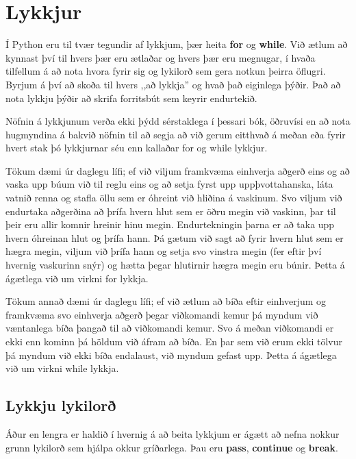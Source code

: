 
\chapter{Lykkjur}\label{k:lykkjur}

Í Python eru til tvær tegundir af lykkjum, þær heita \textbf{for} og \textbf{while}.
Við ætlum að kynnast því til hvers þær eru ætlaðar og hvers þær eru megnugar, í hvaða tilfellum á að nota hvora fyrir sig og lykilorð sem gera notkun þeirra öflugri.
Byrjum á því að skoða til hvers ,,að lykkja'' og hvað það eiginlega þýðir.
Það að nota lykkju þýðir að skrifa forritsbút sem keyrir endurtekið.

Nöfnin á lykkjunum verða ekki þýdd sérstaklega í þessari bók, öðruvísi en að nota hugmyndina á bakvið nöfnin til að segja að við gerum eitthvað á meðan eða fyrir hvert stak þó lykkjurnar séu enn kallaðar for og while lykkjur.

Tökum dæmi úr daglegu lífi; ef við viljum framkvæma einhverja aðgerð eins og að vaska upp búum við til reglu eins og að setja fyrst upp uppþvottahanska, láta vatnið renna og stafla öllu sem er óhreint við hliðina á vaskinum. 
Svo viljum við endurtaka aðgerðina að þrífa hvern hlut sem er öðru megin við vaskinn, þar til þeir eru allir komnir hreinir hinu megin.
Endurtekningin þarna er að taka upp hvern óhreinan hlut og þrífa hann.
Þá gætum við sagt að fyrir hvern hlut sem er hægra megin, viljum við þrífa hann og setja svo vinstra megin (fer eftir því hvernig vaskurinn snýr) og hætta þegar hlutirnir hægra megin eru búnir.
Þetta á ágætlega við um virkni for lykkja.

Tökum annað dæmi úr daglegu lífi; ef við ætlum að bíða eftir einhverjum og framkvæma svo einhverja aðgerð þegar viðkomandi kemur þá myndum við væntanlega bíða þangað til að viðkomandi kemur.
Svo á meðan viðkomandi er ekki enn kominn þá höldum við áfram að bíða.
En þar sem við erum ekki tölvur þá myndum við ekki bíða endalaust, við myndum gefast upp.
Þetta á ágætlega við um virkni while lykkja.

\section{Lykkju lykilorð}\label{uk:lykkjulykilorð}
Áður en lengra er haldið í hvernig á að beita lykkjum er ágætt að nefna nokkur grunn lykilorð sem hjálpa okkur gríðarlega.
Þau eru \textbf{pass}, \textbf{continue} og \textbf{break}.

